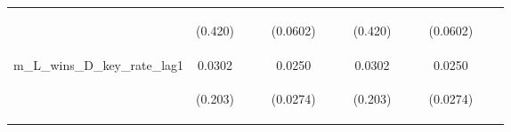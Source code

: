 \documentclass[]{article}
\begin{document}
\begin{center}
\begin{tabular}{lcccccccccccc}
\vspace{4pt} & \begin{footnotesize}(0.420)\end{footnotesize} & \begin{footnotesize}\end{footnotesize} & \begin{footnotesize}\end{footnotesize} & \begin{footnotesize}(0.0602)\end{footnotesize} & \begin{footnotesize}\end{footnotesize} & \begin{footnotesize}\end{footnotesize} & \begin{footnotesize}(0.420)\end{footnotesize} & \begin{footnotesize}\end{footnotesize} & \begin{footnotesize}\end{footnotesize} & \begin{footnotesize}(0.0602)\end{footnotesize} & \begin{footnotesize}\end{footnotesize} & \begin{footnotesize}\end{footnotesize} \\
m\_L\_wins\_D\_key\_rate\_lag1 & 0.0302 &  &  & 0.0250 &  &  & 0.0302 &  &  & 0.0250 &  &  \\
\vspace{4pt} & \begin{footnotesize}(0.203)\end{footnotesize} & \begin{footnotesize}\end{footnotesize} & \begin{footnotesize}\end{footnotesize} & \begin{footnotesize}(0.0274)\end{footnotesize} & \begin{footnotesize}\end{footnotesize} & \begin{footnotesize}\end{footnotesize} & \begin{footnotesize}(0.203)\end{footnotesize} & \begin{footnotesize}\end{footnotesize} & \begin{footnotesize}\end{footnotesize} & \begin{footnotesize}(0.0274)\end{footnotesize} & \begin{footnotesize}\end{footnotesize} & \begin{footnotesize}\end{footnotesize} \\

\end{tabular}
\end{center}
\end{document}
